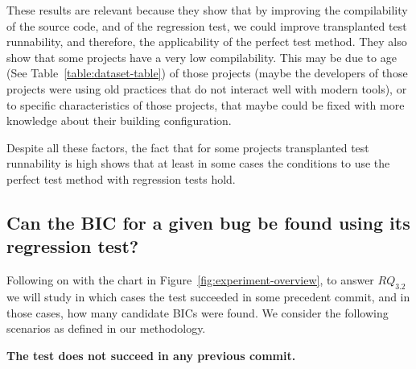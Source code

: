 These results are relevant because they show that by improving the compilability of the source code, and of the regression test, we could improve transplanted test runnability, and therefore, the applicability of the perfect test method. They also show that some projects have a very low compilability. 
This may be due to age (See Table~\ref{table:dataset-table})
of those projects (maybe the developers of those projects were using old practices that do not interact well with modern tools), or to specific characteristics of those projects, that maybe could be fixed with more knowledge about their building configuration.

Despite all these factors, the fact that for some projects transplanted test runnability is high shows that at least in some cases the conditions to use the perfect test method with regression tests hold.

\vspace{0.4cm}


\subsection{Can the BIC for a given bug be found using its regression test?}
\label{sec:rq2}

Following on with the chart in Figure~\ref{fig:experiment-overview}, to answer $RQ_{3.2}$ we will study in which cases the test succeeded in some precedent commit, and in those cases, how many candidate BICs were found. We consider the following scenarios as defined in our methodology. 

\textbf{The test does not succeed in any previous commit.}

